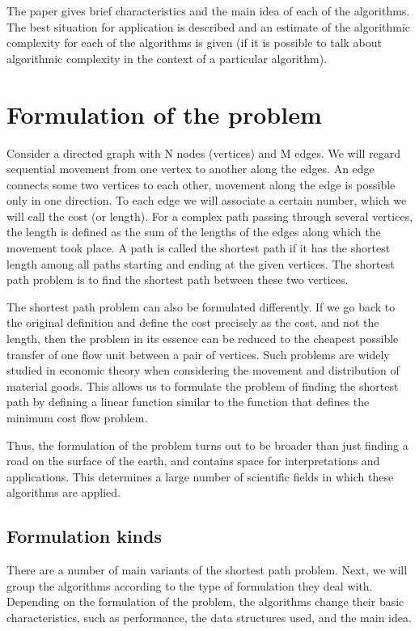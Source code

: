     The paper gives brief characteristics and the main idea of each of the algorithms.
    The best situation for application is described and an estimate of the algorithmic complexity for each of the algorithms is given (if it is possible to talk about algorithmic complexity in the context of a particular algorithm).

    
    \section{Formulation of the problem}
    Consider a directed graph with N nodes (vertices) and M edges.
    We will regard sequential movement from one vertex to another along the edges.
    An edge connects some two vertices to each other, movement along the edge is possible only in one direction.
    To each edge we will associate a certain number, which we will call the cost (or length).
    For a complex path passing through several vertices, the length is defined as the sum of the lengths of the edges along which the movement took place.
    A path is called the shortest path if it has the shortest length among all paths starting and ending at the given vertices.
    The shortest path problem is to find the shortest path between these two vertices.

    The shortest path problem can also be formulated differently.
    If we go back to the original definition and define the cost precisely as the cost, and not the length, then the problem in its essence can be reduced to the cheapest possible transfer of one flow unit between a pair of vertices.
    Such problems are widely studied in economic theory when considering the movement and distribution of material goods.
    This allows us to formulate the problem of finding the shortest path by defining a linear function similar to the function that defines the minimum cost flow problem.

    Thus, the formulation of the problem turns out to be broader than just finding a road on the surface of the earth, and contains space for interpretations and applications. This determines a large number of scientific fields in which these algorithms are applied.

    
    \subsection{Formulation kinds}
    There are a number of main variants of the shortest path problem. Next, we will group the algorithms according to the type of formulation they deal with. Depending on the formulation of the problem, the algorithms change their basic characteristics, such as performance, the data structures used, and the main idea.


